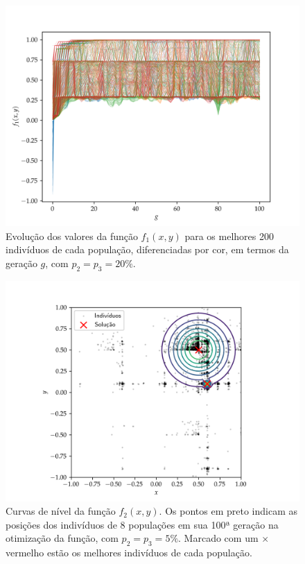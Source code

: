 \begin{figure}[p]
  \centering
  \includegraphics[width=\textwidth]{imagens/high_prob/evolution_damped_cossine.png}
  \caption{
    Evolução dos valores da função $ f_1(x,y) $ para os
    melhores 200 indivíduos de cada população, diferenciadas por cor, em termos da geração $g$,
    com $ p_2 = p_3 = 20\% $.
  }
  \label{fig:evolution_damped_cossine_mut_20}
\end{figure}

\begin{figure}[p]
  \centering
  \includegraphics[width=\textwidth]{imagens/low_prob/contour_near_gaussians.png}
  \caption{
    Curvas de nível da função $f_2(x,y)$. Os pontos em preto indicam as posições dos indivíduos
    de 8 populações em sua 100ª geração na otimização da função, com $ p_2 = p_3 = 5\% $. 
    Marcado com um $\times$ vermelho estão os melhores indivíduos de cada população.
  }
  \label{fig:contour_near_gaussians}
\end{figure}


